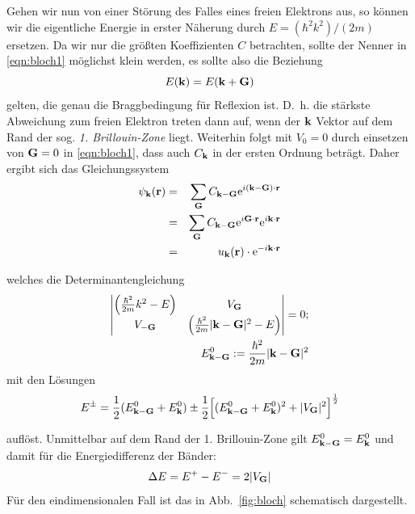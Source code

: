 Gehen wir nun von einer Störung des Falles eines freien Elektrons aus, so können wir 
die eigentliche Energie in erster Näherung durch $E = (\hbar^2 k^2) / (2m)$ ersetzen. 
Da wir nur die größten Koeffizienten $C$ betrachten, sollte der Nenner 
in \eqref{eqn:bloch1} möglichst klein werden, es sollte also die Beziehung 
\begin{equation}
    E(\mathbf{k}) = E(\mathbf{k} + \mathbf{G})
\end{equation}
gelten, die genau die Braggbedingung für Reflexion ist. D.~h. die stärkste Abweichung zum freien 
Elektron treten dann auf, wenn der $\mathbf{k}$ Vektor auf dem Rand der sog. \emph{1. Brillouin-Zone} liegt. 
Weiterhin folgt mit $V_0 = 0$ durch einsetzen von $\mathbf{G} = 0$ in \eqref{eqn:bloch1}, dass auch $C_{\mathbf{k}}$ in der ersten Ordnung 
beträgt. Daher ergibt sich das Gleichungssystem 
\begin{eqnarray}
    \psi_{\mathbf{k}}(\mathbf{r})&=& \sum_{\mathbf{G}} C_{\mathbf{k} - \mathbf{G}} \mathrm{e}^{i(\mathbf{k} - \mathbf{G}) \cdot \mathbf{r}} \nonumber \\
            &=& \sum_{\mathbf{G}} C_{\mathbf{k} - \mathbf{G}} \mathrm{e}^{i \mathbf{G} \cdot \mathbf{r}}  \mathrm{e}^{i\mathbf{k} \cdot \mathbf{r}} \nonumber \\
            &=& u_{\mathbf{k}}(\mathbf{r}) \cdot \mathrm{e}^{-i\mathbf{k} \cdot \mathbf{r}} 
\end{eqnarray}

welches die Determinantengleichung 
\begin{eqnarray}
    \begin{vmatrix}
        \Big(\frac{\hbar^2}{2m} k^2 - E\Big) & V_{\mathbf{G}} \\
        V_\mathbf{-G}   & \Big(\frac{\hbar^2}{2m} |\mathbf{k} - \mathbf{G}|^2 - E\Big) 
    \end{vmatrix} = 0; \\
    E_{\mathbf{k} - \mathbf{G}}^0 := \frac{\hbar^2}{2m} |\mathbf{k} - \mathbf{G}|^2 \nonumber
\end{eqnarray}
mit den Lösungen 
\begin{equation}
    E^\pm = 
    \frac{1}{2}(E_{\mathbf{k} - \mathbf{G}}^0 + E_{\mathbf{k}}^0) \pm 
        \frac{1}{2}\Big[(E_{\mathbf{k} - \mathbf{G}}^0 + E_{\mathbf{k}}^0)^2 + |V_{\mathbf{G}}|^2\Big]^{\frac{1}{2}}
\end{equation}

auflöst. Unmittelbar auf dem Rand der 1. Brillouin-Zone gilt $E_{\mathbf{k} - \mathbf{G}}^0 = E_{\mathbf{k}}^0$ und 
damit für die Energiedifferenz der Bänder: 
\begin{equation}
    \Delta E = E^+ - E^- = 2 |V_{\mathbf{G}}|
\end{equation}
Für den eindimensionalen Fall ist das in Abb.~\ref{fig:bloch} schematisch dargestellt.
\cite{ibach2009festkorperphysik} 

